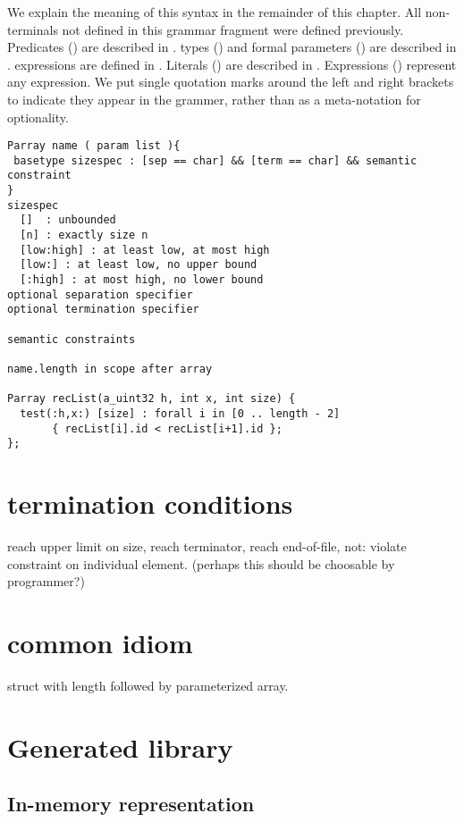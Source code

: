 \noindent
We explain the meaning of this syntax in the remainder of this chapter.
All non-terminals not defined in this grammar fragment were
defined previously.
Predicates () are described in .
\padsl{} types () and formal parameters ()
are described in .
\padsl{} expressions  are defined in .
Literals ()  are described in
.
Expressions () represent any \C{} expression.
We put single quotation marks around the left and right brackets to
indicate they appear in the grammer, rather than as a meta-notation
for optionality.


\begin{verbatim}
Parray name ( param list ){
 basetype sizespec : [sep == char] && [term == char] && semantic constraint
}
sizespec 
  []  : unbounded
  [n] : exactly size n
  [low:high] : at least low, at most high
  [low:] : at least low, no upper bound
  [:high] : at most high, no lower bound
optional separation specifier
optional termination specifier

semantic constraints

name.length in scope after array

Parray recList(a_uint32 h, int x, int size) {
  test(:h,x:) [size] : forall i in [0 .. length - 2]
       { recList[i].id < recList[i+1].id };
};
\end{verbatim}

\section{termination conditions}
reach upper limit on size, reach terminator, reach end-of-file, 
not: violate constraint on individual element. (perhaps this should be
choosable by programmer?)


\section{common idiom}
struct with length followed by parameterized array.


\section{Generated library}
\subsection{In-memory representation}
\label{sec:arrays-rep}

